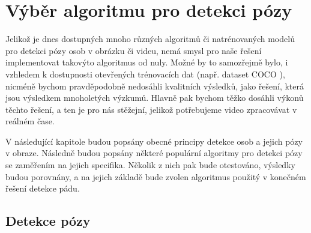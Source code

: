 \chapter{Výběr algoritmu pro detekci pózy}
\label{sec:Pose}

Jelikož je dnes dostupných mnoho různých algoritmů či natrénovaných modelů pro
detekci pózy osob v obrázku či videu, nemá smysl pro naše řešení implementovat
takovýto algoritmus od nuly. Možné by to samozřejmě bylo, i vzhledem k
dostupnosti otevřených trénovacích dat (např. dataset COCO \cite{coco}),
nicméně bychom pravděpodobně nedosáhli kvalitních výsledků, jako řešení, která
jsou výsledkem mnoholetých výzkumů. Hlavně pak bychom těžko dosáhli výkonů
těchto řešení, a ten je pro nás stěžejní, jelikož potřebujeme video zpracovávat
v reálném čase.

V následující kapitole budou popsány obecné principy detekce osob a jejich pózy
v obraze. Následně budou popsány některé populární algoritmy pro detekci pózy
se zaměřením na jejich specifika. Několik z nich pak bude otestováno, výsledky
budou porovnány, a na jejich základě bude zvolen algoritmus použitý v konečném
řešení detekce pádu.

\section{Detekce pózy}

